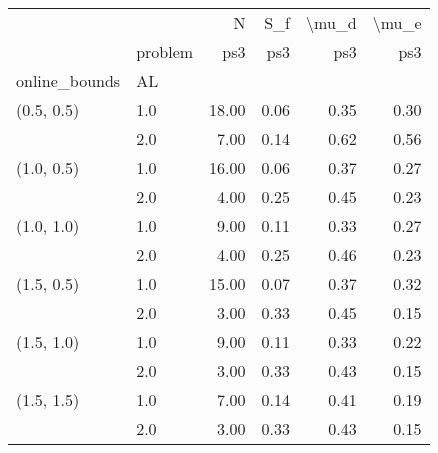 \begin{tabular}{llrrrr}
\toprule
           & {} &     N &  S\_f & \textbackslash mu\_d & \textbackslash mu\_e \\
           & problem &   ps3 &  ps3 &   ps3 &   ps3 \\
online\_bounds & AL &       &      &       &       \\
\midrule
(0.5, 0.5) & 1.0 & 18.00 & 0.06 &  0.35 &  0.30 \\
           & 2.0 &  7.00 & 0.14 &  0.62 &  0.56 \\
(1.0, 0.5) & 1.0 & 16.00 & 0.06 &  0.37 &  0.27 \\
           & 2.0 &  4.00 & 0.25 &  0.45 &  0.23 \\
(1.0, 1.0) & 1.0 &  9.00 & 0.11 &  0.33 &  0.27 \\
           & 2.0 &  4.00 & 0.25 &  0.46 &  0.23 \\
(1.5, 0.5) & 1.0 & 15.00 & 0.07 &  0.37 &  0.32 \\
           & 2.0 &  3.00 & 0.33 &  0.45 &  0.15 \\
(1.5, 1.0) & 1.0 &  9.00 & 0.11 &  0.33 &  0.22 \\
           & 2.0 &  3.00 & 0.33 &  0.43 &  0.15 \\
(1.5, 1.5) & 1.0 &  7.00 & 0.14 &  0.41 &  0.19 \\
           & 2.0 &  3.00 & 0.33 &  0.43 &  0.15 \\
\bottomrule
\end{tabular}

